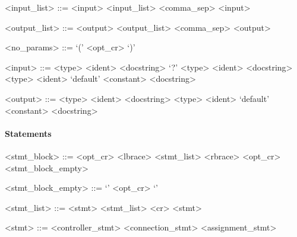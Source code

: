 \vs

\begin{grammar}
  <input_list> ::= <input>
  \alt <input_list> <comma_sep> <input>
\end{grammar}

\vs

\begin{grammar}
  <output_list> ::= <output>
  \alt <output_list> <comma_sep> <output>
\end{grammar}

\vs

\begin{grammar}
  <no_params> ::= `(' <opt_cr> `)'
\end{grammar}

\vs

\begin{grammar}
  <input> ::= <type> <ident> <docstring>
  \alt `?' <type> <ident> <docstring>
  \alt <type> <ident> `default' <constant> <docstring>
\end{grammar}

\vs

\begin{grammar}
  <output> ::= <type> <ident> <docstring>
  \alt <type> <ident> `default' <constant> <docstring>
\end{grammar}


\paragraph{Statements}

\begin{grammar}
  <stmt_block> ::= <opt_cr> <lbrace> <stmt_list> <rbrace>
  \alt <opt_cr> <stmt_block_empty>
\end{grammar}

\vs

\begin{grammar}
  <stmt_block_empty> ::= `{' <opt_cr> `}'
\end{grammar}

\vs

\begin{grammar}
  <stmt_list> ::= <stmt>
  \alt <stmt_list> <cr> <stmt>
\end{grammar}

\vs

\begin{grammar}
  <stmt> ::= <controller_stmt>
  \alt <connection_stmt>
  \alt <assignment_stmt>
\end{grammar}

